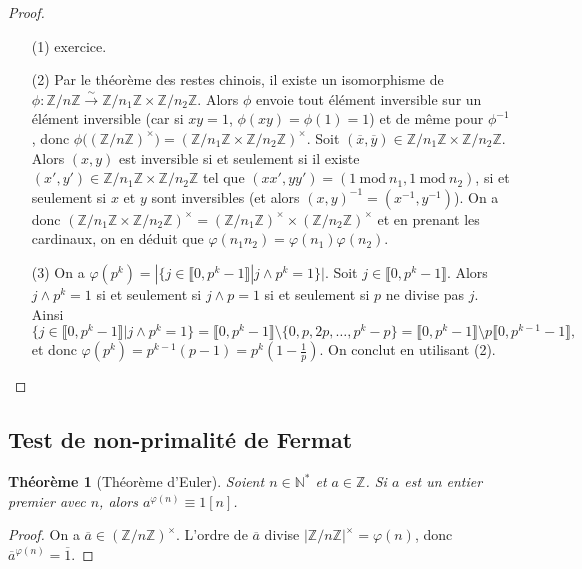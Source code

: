\documentclass[12pt]{report}
\newtheorem{thm}{Théorème}[chapter]
\newcommand{\Z}{\mathbb{Z}}
\begin{document}
\begin{proof}\
\begin{itemize}
\item[(1)]  exercice.


\item[(2)] Par le théorème des restes chinois, il existe un isomorphisme de  $\phi:\Z/n\Z\overset{\sim}{\rightarrow}\Z/n_1\Z\times \Z/n_2 \Z$. Alors $\phi$ envoie tout élément inversible sur un élément inversible (car si $xy=1$, $\phi(xy)=\phi(1)=1$) et de même pour $\phi^{-1}$, donc $\phi\big((\Z/n\Z)^\times\big)=(\Z/n_1\Z\times \Z/n_2\Z)^\times$. Soit $(\overline{x},\overline{y})\in \Z/n_1\Z\times \Z/n_2\Z$. Alors $(x,y)$ est inversible si et seulement si il existe $(x',y')\in  \Z/n_1\Z\times \Z/n_2\Z$ tel que $(xx',yy')=(1\mathrm{\ mod\ }n_1,1\mathrm{\ mod\ }n_2)$, si et seulement si $x$ et $y$ sont inversibles (et alors $(x,y)^{-1}=(x^{-1},y^{-1})$). On a donc   $(\Z/n_1\Z\times \Z/n_2 \Z)^{\times}=(\Z/n_1\Z)^\times \times (\Z/n_2\Z)^\times$ et en prenant les cardinaux, on en déduit que $\varphi(n_1n_2)=\varphi(n_1)\varphi(n_2)$. 



\item[(3)] On a $\varphi(p^k)=|\{j\in \llbracket 0,p^k-1\rrbracket| j\wedge p^k=1\}|$. Soit $j\in \llbracket 0,p^k-1\rrbracket$. Alors $j\wedge p^k=1$ si et seulement si $j\wedge p=1$ si et seulement si $p$ ne divise pas $j$. Ainsi \[\{j\in \llbracket 0,p^k-1\rrbracket| j\wedge p^k=1\}= \llbracket 0,p^k-1\rrbracket\setminus \{0,p,2p,\ldots, p^k-p\}=\llbracket 0,p^k-1\rrbracket \setminus p\llbracket 0,p^{k-1}-1\rrbracket,\] et donc $\varphi(p^k)=p^{k-1}(p-1)=p^k(1-\frac{1}{p})$. On conclut en utilisant (2).
\end{itemize}
\end{proof}



\subsection{Test de non-primalité de Fermat}


\begin{thm}[Théorème d'Euler]
Soient $n \in \mathbb{N}^*$ et $a\in \Z$. Si $a$ est un entier premier avec $n$, alors $a^{\varphi(n)}\equiv 1 [n]$.
\end{thm}

\begin{proof}
On a $\overline{a}\in (\Z/n\Z)^\times$. L'ordre de $\overline{a}$ divise $|\Z/n\Z|^\times=\varphi(n)$, donc $\overline{a}^{\varphi(n)}=\overline{1}$.
\end{proof}
\end{document}
